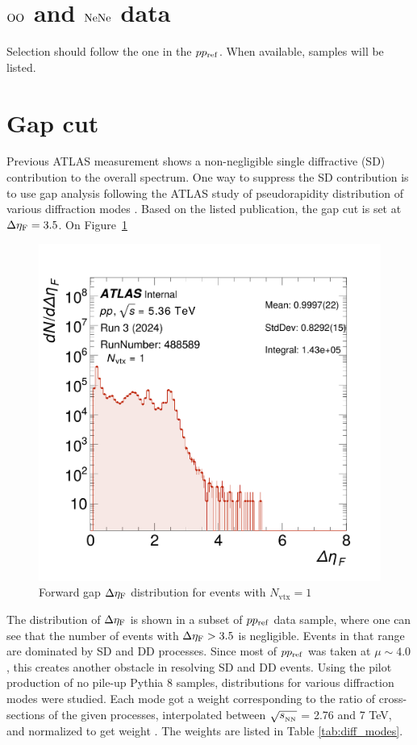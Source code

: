 \section{$\text{OO}$ and $\text{NeNe}$ data}
{\blue Selection should follow the one in the $pp_{\mathrm{ref}}$. When available, samples will be listed. }

\section{Gap cut}
Previous ATLAS measurement \cite{chargedHadroninPP2010} shows a non-negligible single diffractive (SD) contribution to the overall \pT spectrum. One way to suppress the SD contribution is to use gap analysis following the ATLAS study of pseudorapidity distribution of various diffraction modes \cite{gapXS}. Based on the listed publication, the gap cut is set at $\Delta \eta_{\mathrm{F}} = 3.5$. On Figure~\ref{fig:forward_gap} 
\begin{figure}[h]
    \centering
    \includegraphics[width=0.7\linewidth]{images/forward_gap_488589.png}
    \caption{Forward gap $\Delta \eta_{\mathrm{F}}$ distribution for events with $N_\text{vtx} = 1$}
    \label{fig:forward_gap}
\end{figure} The distribution of $\Delta \eta_{\mathrm{F}}$ is shown in a subset of $pp_{\mathrm{ref}}$ data sample, where one can see that the number of events with $\Delta \eta_{\mathrm{F}} > 3.5$ is negligible. Events in that range are dominated by SD and DD processes. Since most of $pp_{\mathrm{ref}}$ was taken at $\mu\sim 4.0$, this creates another obstacle in resolving SD and DD events. Using the pilot production of no pile-up Pythia 8 samples, distributions for various diffraction modes were studied. Each mode got a weight corresponding to the ratio of cross-sections of the given processes, interpolated between $\sqrt{s_{_\text{NN}}}$ = 2.76 and 7 TeV, and normalized to get weight \cite{Ciesielski:2012mc}. The weights are listed in Table \ref{tab:diff_modes}.


